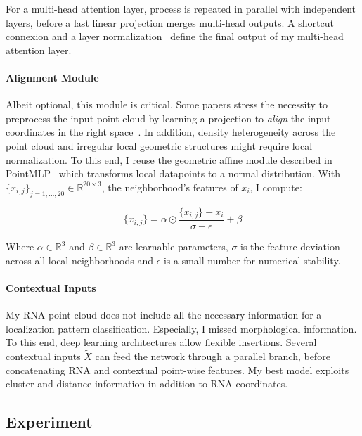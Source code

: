 For a multi-head attention layer, process is repeated in parallel with independent layers, before a last linear projection merges multi-head outputs.
A shortcut connexion and a layer normalization~\cite{ba2016layer} define the final output of my multi-head attention layer.

\paragraph{Alignment Module}

Albeit optional, this module is critical.
Some papers stress the necessity to preprocess the input point cloud by learning a projection to \emph{align} the input coordinates in the right space~\cite{Qi_2017_CVPR,Wang_2019}.
In addition, density heterogeneity across the point cloud and irregular local geometric structures might require local normalization.
To this end, I reuse the geometric affine module described in PointMLP~\cite{ma2022rethinking} which transforms local datapoints to a normal distribution.
With $\{x_{i, j}\}_{j=1,\dots,20} \in \mathbb{R}^{20 \times 3}$, the neighborhood's features of $x_i$, I compute:

\begin{equation}
	{\displaystyle \{x_{i, j}\} = \alpha \odot \frac{\{x_{i, j}\} - x_i}{\sigma + \epsilon} + \beta}
\end{equation}

\noindent
Where $\alpha \in \mathbb{R}^3$ and $\beta \in \mathbb{R}^3$ are learnable parameters, $\sigma$ is the feature deviation across all local neighborhoods and $\epsilon$ is a small number for numerical stability.

\paragraph{Contextual Inputs}

My \ac{RNA} point cloud does not include all the necessary information for a localization pattern classification.
Especially, I missed morphological information.
To this end, deep learning architectures allow flexible insertions.
Several contextual inputs $\tilde{X}$ can feed the network through a parallel branch, before concatenating \ac{RNA} and contextual point-wise features.
My best model exploits cluster and distance information in addition to \ac{RNA} coordinates.

\subsection{Experiment}
\label{subsec:experiment}


